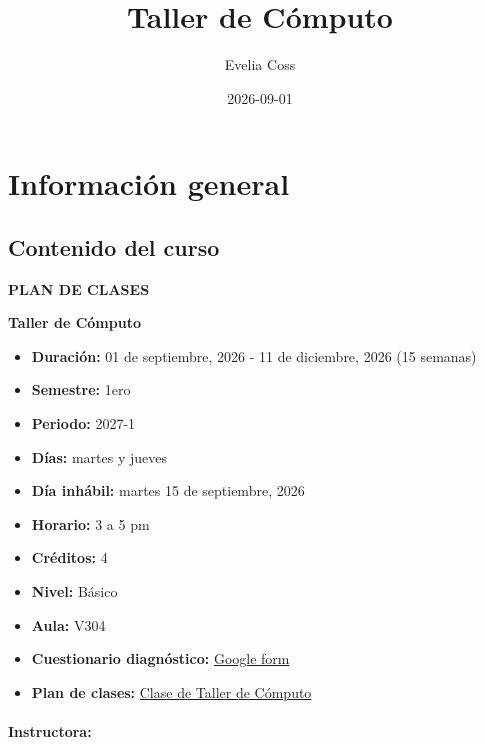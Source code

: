 \documentclass[
  spanish,
  12pt,
  letterpaper,
  DIV=11,
  numbers=noendperiod]{scrreprt}
\title{Taller de Cómputo}
\author{Evelia Coss}
\date{2026-09-01}
\providecommand{\tightlist}{%
  \setlength{\itemsep}{0pt}\setlength{\parskip}{0pt}}
\renewcommand*\contentsname{Tabla de contenidos}
\newcommand\contentsname{Tabla de contenidos}
\begin{document}
\maketitle

\renewcommand*\contentsname{Tabla de contenidos}
{
\setcounter{tocdepth}{2}
\tableofcontents
}


\chapter*{Información general}\label{informaciuxf3n-general}


\section{Contenido del curso 📌}

\textbf{PLAN DE CLASES}

{\textbf{Taller de Cómputo}}

\begin{itemize}
\tightlist
\item
  \textbf{Duración:} {01 de septiembre, 2026 - 11 de diciembre, 2026 (15
  semanas)}
\item
  \textbf{Semestre:} 1ero
\item
  \textbf{Periodo:} 2027-1
\item
  \textbf{Días:} martes y jueves
\item
  \textbf{Día inhábil:} martes 15 de septiembre, 2026
\item
  \textbf{Horario:} 3 a 5 pm
\item
  \textbf{Créditos:} 4
\item
  \textbf{Nivel:} Básico
\item
  \textbf{Aula:} V304
\item
  \textbf{Cuestionario diagnóstico:}
  {\href{https://forms.gle/xxpcC6z4UhiV9iER8}{Google form}}
\item
  \textbf{Plan de clases:}
  {\href{https://docs.google.com/document/d/17rDksWqGWQqDFUMFqzgVF_BXnBDP3KMUrysgxIPGv9U/edit?usp=sharing}{Clase
  de Taller de Cómputo}}
\end{itemize}

\subsubsection*{\texorpdfstring{\textbf{Instructora:}}{Instructora:}}\label{instructora}
\end{document}
